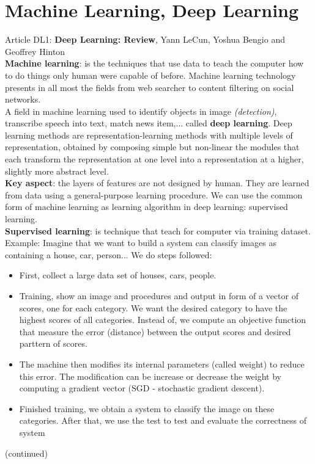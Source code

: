 \documentclass[12pt, a4paper]{report}
\begin{document}
\section*{Machine Learning, Deep Learning}
	Article DL1: \textbf{Deep Learning: Review}, Yann LeCun, Yoshua Bengio and Geoffrey Hinton\\[0.3cm]
	\textbf{Machine learning}: is the techniques that use data to teach the computer how to do things only human were capable of before. Machine learning technology presents in all most the fields from web searcher to content filtering on social networks.\\
	A field in machine learning used to identify objects in image \textit{(detection)}, transcribe speech into text, match news item,... called \textbf{deep learning}. Deep learning methods are representation-learning methods with multiple levels of representation, obtained by composing simple but non-linear the modules that each transform the representation at one level into a representation at a higher, slightly more abstract level.\\
	\textbf{Key aspect}: the layers of features are not designed by human. They are learned from data using a general-purpose learning procedure. We can use the common form of machine learning as learning algorithm in deep learning: supervised learning.\\[0.3cm]
	\textbf{Supervised learning}: is technique that teach for computer via training dataset. \\
	Example: Imagine that we want to build a system can classify images as containing a house, car, person... We do steps followed:
	\begin{itemize}
		\item First, collect a large data set of houses, cars, people.
		\item Training, show an image and procedures and output in form of a vector of scores, one for each category. We want the desired category to have the highest scores of all categories. Instead of, we compute an objective function that measure the error (distance) between the output scores and desired parttern of scores.
		\item The machine then modifies its internal parameters (called weight) to reduce this error. The modification can be increase or decrease the weight by computing a gradient vector (SGD - stochastic gradient descent).
		\item Finished training, we obtain a system to classify the image on these categories. After that, we use the test to test and evaluate the correctness of system
	\end{itemize}
	(continued)
\end{document}
